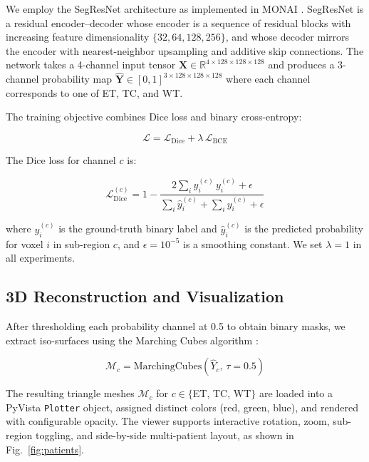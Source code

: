 \documentclass[conference]{IEEEtran}
\begin{document}
We employ the SegResNet architecture \cite{myronenko2018} as implemented in
MONAI \cite{monai2020}. SegResNet is a residual encoder--decoder whose
encoder is a sequence of residual blocks with increasing feature
dimensionality $\{32, 64, 128, 256\}$, and whose decoder mirrors the
encoder with nearest-neighbor upsampling and additive skip connections.
The network takes a 4-channel input tensor
$\mathbf{X} \in \mathbb{R}^{4 \times 128 \times 128 \times 128}$ and
produces a 3-channel probability map
$\hat{\mathbf{Y}} \in [0,1]^{3 \times 128 \times 128 \times 128}$
where each channel corresponds to one of ET, TC, and WT.

The training objective combines Dice loss and binary cross-entropy:

\begin{equation}
  \mathcal{L} = \mathcal{L}_{\text{Dice}} + \lambda\,\mathcal{L}_{\text{BCE}}
  \label{eq:loss}
\end{equation}

The Dice loss for channel $c$ is:

\begin{equation}
  \mathcal{L}^{(c)}_{\text{Dice}} =
    1 - \frac{2\sum_{i} \hat{y}^{(c)}_i\, y^{(c)}_i + \epsilon}
             {\sum_{i} \hat{y}^{(c)}_i + \sum_{i} y^{(c)}_i + \epsilon}
  \label{eq:dice_loss}
\end{equation}

where $y^{(c)}_i$ is the ground-truth binary label and $\hat{y}^{(c)}_i$
is the predicted probability for voxel $i$ in sub-region $c$, and
$\epsilon = 10^{-5}$ is a smoothing constant. We set $\lambda = 1$ in all
experiments.

\subsection{3D Reconstruction and Visualization}

After thresholding each probability channel at 0.5 to obtain binary masks,
we extract iso-surfaces using the Marching Cubes algorithm
\cite{lorensen1987marching}:

\begin{equation}
  \mathcal{M}_c = \text{MarchingCubes}\!\left(\hat{Y}_c,\, \tau = 0.5\right)
  \label{eq:mc}
\end{equation}

The resulting triangle meshes $\mathcal{M}_c$ for $c \in \{$ET, TC, WT$\}$
are loaded into a PyVista \texttt{Plotter} object, assigned distinct
colors (red, green, blue), and rendered with configurable opacity. The
viewer supports interactive rotation, zoom, sub-region toggling, and
side-by-side multi-patient layout, as shown in Fig.~\ref{fig:patients}.
\end{document}

